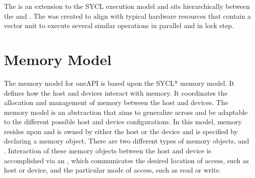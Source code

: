\documentclass[letterpaper,10pt,english]{sphinxmanual}
\begin{document}
The  is an extension to the SYCL execution model and
sits hierarchically between the  and . The
 was created to align with typical hardware resources
that contain a vector unit to execute several similar operations in
parallel and in lock step.


\section{Memory Model}
\label{\detokenize{programming-model/memory-model:memory-model}}\label{\detokenize{programming-model/memory-model:id1}}\label{\detokenize{programming-model/memory-model::doc}}
The memory model for oneAPI is based upon the SYCL* memory model. It
defines how the host and devices interact with memory. It coordinates
the allocation and management of memory between the host and devices.
The memory model is an abstraction that aims to generalize across and
be adaptable to the different possible host and device
configurations. In this model, memory resides upon and is owned by
either the host or the device and is specified by declaring a memory
object. There are two different types of memory objects,
{\hyperref[\detokenize{glossary:term-buffers}]{}} and {\hyperref[\detokenize{glossary:term-images}]{}}.  Interaction of these memory
objects between the host and device is accomplished via an
{\hyperref[\detokenize{glossary:term-accessor}]{}}, which communicates the desired location of access,
such as host or device, and the particular mode of access, such as
read or write.
\end{document}
